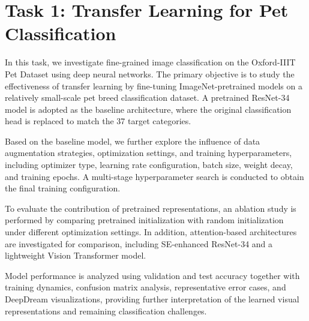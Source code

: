 \section{Task 1: Transfer Learning for Pet Classification}

In this task, we investigate fine-grained image classification on the Oxford-IIIT Pet Dataset using deep neural networks. The primary objective is to study the effectiveness of transfer learning by fine-tuning ImageNet-pretrained models on a relatively small-scale pet breed classification dataset. A pretrained ResNet-34 model is adopted as the baseline architecture, where the original classification head is replaced to match the 37 target categories.

Based on the baseline model, we further explore the influence of data augmentation strategies, optimization settings, and training hyperparameters, including optimizer type, learning rate configuration, batch size, weight decay, and training epochs. A multi-stage hyperparameter search is conducted to obtain the final training configuration.

To evaluate the contribution of pretrained representations, an ablation study is performed by comparing pretrained initialization with random initialization under different optimization settings. In addition, attention-based architectures are investigated for comparison, including SE-enhanced ResNet-34 and a lightweight Vision Transformer model.

Model performance is analyzed using validation and test accuracy together with training dynamics, confusion matrix analysis, representative error cases, and DeepDream visualizations, providing further interpretation of the learned visual representations and remaining classification challenges.












